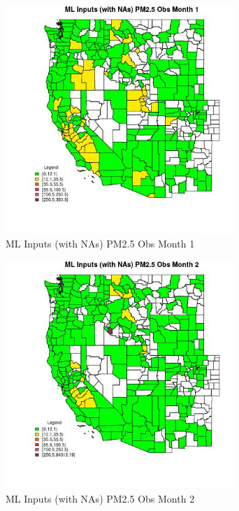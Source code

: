 
\clearpage 

\begin{figure} 
\centering  
\includegraphics[width=0.77\textwidth]{Code_Outputs/Report_ML_input_PM25_Step4_part_f_de_duplicated_aveswNAs_CountyPM25_ObsmedianMonth1.jpg} 
\caption{\label{fig:Report_ML_input_PM25_Step4_part_f_de_duplicated_aveswNAsCountyPM25_ObsmedianMonth1}ML Inputs (with NAs) PM2.5 Obs Month 1} 
\end{figure} 
 

\begin{figure} 
\centering  
\includegraphics[width=0.77\textwidth]{Code_Outputs/Report_ML_input_PM25_Step4_part_f_de_duplicated_aveswNAs_CountyPM25_ObsmedianMonth2.jpg} 
\caption{\label{fig:Report_ML_input_PM25_Step4_part_f_de_duplicated_aveswNAsCountyPM25_ObsmedianMonth2}ML Inputs (with NAs) PM2.5 Obs Month 2} 
\end{figure} 
 

